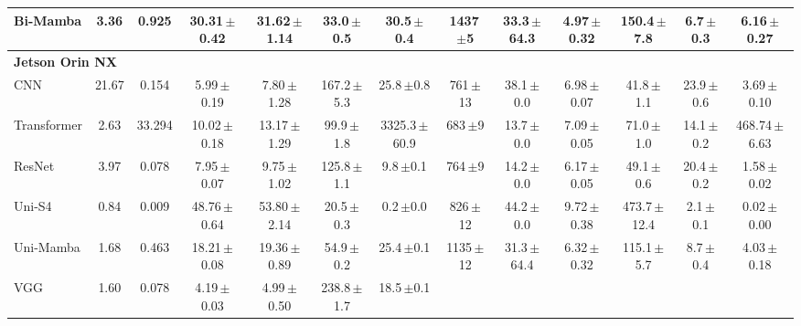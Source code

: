 \documentclass[sigconf,nonacm]{acmart}
\begin{document}
\begin{table}[t]
{\begin{tabular}{lcccccccccccc}
    Bi-Mamba & 3.36 & 0.925
      & 30.31{\scriptsize\,$\pm$0.42} & 31.62{\scriptsize\,$\pm$1.14} & 33.0{\scriptsize\,$\pm$0.5} & 30.5{\scriptsize\,$\pm$0.4}
      & 1437{\scriptsize\,$\pm$5} & 33.3{\scriptsize\,$\pm$64.3} & 4.97{\scriptsize\,$\pm$0.32}
      & 150.4{\scriptsize\,$\pm$7.8} & 6.7{\scriptsize\,$\pm$0.3} & 6.16{\scriptsize\,$\pm$0.27} \\
    \midrule
    \multicolumn{13}{l}{\textbf{Jetson Orin NX}} \\
    CNN & 21.67 & 0.154
      & 5.99{\scriptsize\,$\pm$0.19} & 7.80{\scriptsize\,$\pm$1.28} & 167.2{\scriptsize\,$\pm$5.3} & 25.8{\scriptsize\,$\pm$0.8}
      & 761{\scriptsize\,$\pm$13} & 38.1{\scriptsize\,$\pm$0.0} & 6.98{\scriptsize\,$\pm$0.07}
      & 41.8{\scriptsize\,$\pm$1.1} & 23.9{\scriptsize\,$\pm$0.6} & 3.69{\scriptsize\,$\pm$0.10} \\
    Transformer & 2.63 & 33.294
      & 10.02{\scriptsize\,$\pm$0.18} & 13.17{\scriptsize\,$\pm$1.29} & 99.9{\scriptsize\,$\pm$1.8} & 3325.3{\scriptsize\,$\pm$60.9}
      & 683{\scriptsize\,$\pm$9} & 13.7{\scriptsize\,$\pm$0.0} & 7.09{\scriptsize\,$\pm$0.05}
      & 71.0{\scriptsize\,$\pm$1.0} & 14.1{\scriptsize\,$\pm$0.2} & 468.74{\scriptsize\,$\pm$6.63} \\
    ResNet & 3.97 & 0.078
      & 7.95{\scriptsize\,$\pm$0.07} & 9.75{\scriptsize\,$\pm$1.02} & 125.8{\scriptsize\,$\pm$1.1} & 9.8{\scriptsize\,$\pm$0.1}
      & 764{\scriptsize\,$\pm$9} & 14.2{\scriptsize\,$\pm$0.0} & 6.17{\scriptsize\,$\pm$0.05}
      & 49.1{\scriptsize\,$\pm$0.6} & 20.4{\scriptsize\,$\pm$0.2} & 1.58{\scriptsize\,$\pm$0.02} \\
    Uni-S4 & 0.84 & 0.009
      & 48.76{\scriptsize\,$\pm$0.64} & 53.80{\scriptsize\,$\pm$2.14} & 20.5{\scriptsize\,$\pm$0.3} & 0.2{\scriptsize\,$\pm$0.0}
      & 826{\scriptsize\,$\pm$12} & 44.2{\scriptsize\,$\pm$0.0} & 9.72{\scriptsize\,$\pm$0.38}
      & 473.7{\scriptsize\,$\pm$12.4} & 2.1{\scriptsize\,$\pm$0.1} & 0.02{\scriptsize\,$\pm$0.00} \\
    Uni-Mamba & 1.68 & 0.463
      & 18.21{\scriptsize\,$\pm$0.08} & 19.36{\scriptsize\,$\pm$0.89} & 54.9{\scriptsize\,$\pm$0.2} & 25.4{\scriptsize\,$\pm$0.1}
      & 1135{\scriptsize\,$\pm$12} & 31.3{\scriptsize\,$\pm$64.4} & 6.32{\scriptsize\,$\pm$0.32}
      & 115.1{\scriptsize\,$\pm$5.7} & 8.7{\scriptsize\,$\pm$0.4} & 4.03{\scriptsize\,$\pm$0.18} \\
    VGG & 1.60 & 0.078
      & 4.19{\scriptsize\,$\pm$0.03} & 4.99{\scriptsize\,$\pm$0.50} & 238.8{\scriptsize\,$\pm$1.7} & 18.5{\scriptsize\,$\pm$0.1}

\end{tabular}}
\end{table}
\end{document}
